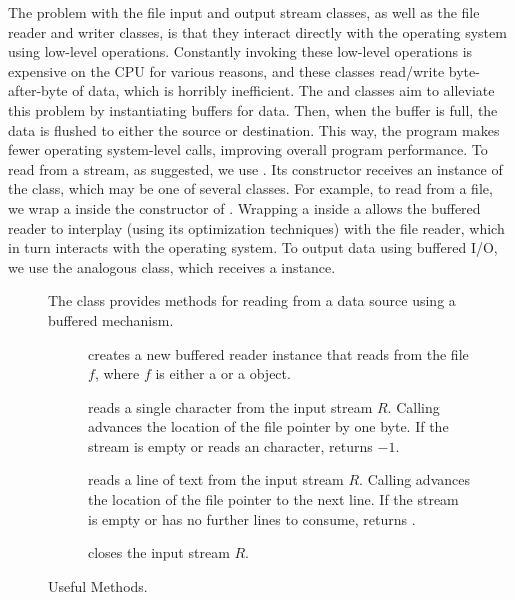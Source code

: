 The problem with the file input and output stream classes, as well as the file reader and writer classes, is that they interact directly with the operating system using low-level operations. Constantly invoking these low-level operations is expensive on the CPU for various reasons, and these classes read/write byte-after-byte of data, which is horribly inefficient. The  and  classes aim to alleviate this problem by instantiating buffers for data. Then, when the buffer is full, the data is flushed to either the source or destination. This way, the program makes fewer operating system-level calls, improving overall program performance. To read from a stream, as suggested, we use . Its constructor receives an instance of the  class, which may be one of several classes. For example, to read from a file, we wrap a  inside the constructor of . Wrapping a  inside a  allows the buffered reader to interplay (using its optimization techniques) with the file reader, which in turn interacts with the operating system. To output data using buffered I/O, we use the analogous  class, which receives a  instance. 

\begin{figure}[tp]
  \small
  \begin{tcolorbox}[title=BufferedReader Methods]
    The  class provides methods for reading from a data source using a buffered mechanism.
    \vspace{2ex}
  \begin{description}
    \item [] creates a new buffered reader instance that reads from the file $f$, where $f$ is either a  or a  object.
    \item [] reads a single character from the input stream $R$. Calling  advances the location of the file pointer by one byte. If the stream is empty or reads an  character, returns $-1$.
    \item [] reads a line of text from the input stream $R$. Calling  advances the location of the file pointer to the next line. If the stream is empty or has no further lines to consume, returns .
    \item [] closes the input stream $R$.
  \end{description}
\end{tcolorbox}
  \caption{Useful  Methods.}
  \label{fig:br}
\end{figure}

